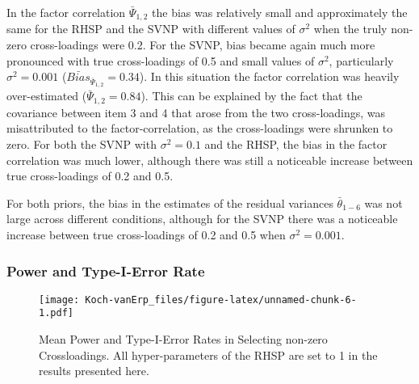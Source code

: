 \documentclass[]{interact}
\theoremstyle{plain}%
\theoremstyle{definition}
\theoremstyle{remark}
\begin{document}
In the factor correlation \(\bar{\Psi}_{1,2}\) the bias was relatively
small and approximately the same for the RHSP and the SVNP with
different values of \(\sigma^2\) when the truly non-zero cross-loadings
were 0.2. For the SVNP, bias became again much more pronounced with true
cross-loadings of 0.5 and small values of \(\sigma^2\), particularly
\(\sigma^2 = 0.001\) (\(\bar{Bias}_{\bar{\Psi}_{1,2}} = 0.34\)). In this
situation the factor correlation was heavily over-estimated
(\(\bar{\Psi}_{1,2} = 0.84\)). This can be explained by the fact that
the covariance between item 3 and 4 that arose from the two
cross-loadings, was misattributed to the factor-correlation, as the
cross-loadings were shrunken to zero. For both the SVNP with
\(\sigma^2 = 0.1\) and the RHSP, the bias in the factor correlation was
much lower, although there was still a noticeable increase between true
cross-loadings of 0.2 and 0.5.

For both priors, the bias in the estimates of the residual variances
\(\bar{\theta}_{1-6}\) was not large across different conditions,
although for the SVNP there was a noticeable increase between true
cross-loadings of 0.2 and 0.5 when \(\sigma^2 = 0.001\).

\hypertarget{power-and-type-i-error-rate-1}{%
\subsubsection{Power and Type-I-Error
Rate}\label{power-and-type-i-error-rate-1}}

\begin{figure}
\centering
\texttt{[image: Koch-vanErp\_files/figure-latex/unnamed-chunk-6-1.pdf]}
\caption{Mean Power and Type-I-Error Rates in Selecting non-zero
Crossloadings. All hyper-parameters of the RHSP are set to 1 in the
results presented here.}
\end{figure}
\end{document}
